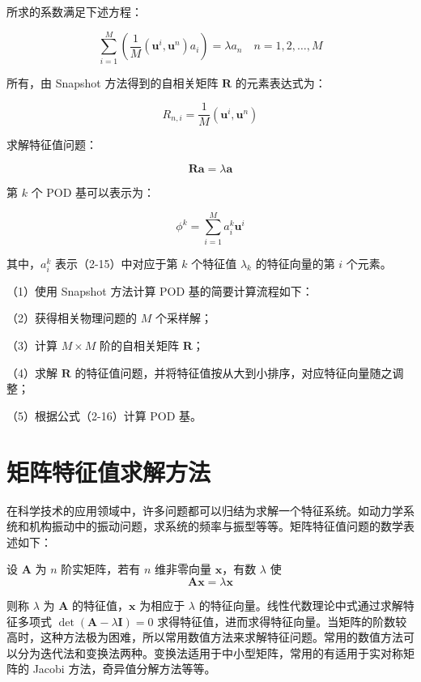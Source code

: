 所求的系数满足下述方程：

\begin{equation}
\sum_{i=1}^M \left( \frac{1}{M} (\mathbf{u}^i, \mathbf{u}^n) a_i \right) = \lambda a_n \quad n = 1, 2, \ldots, M \tag{2-13}
\end{equation}

所有，由 Snapshot 方法得到的自相关矩阵 \(\mathbf{R}\) 的元素表达式为：

\begin{equation}
R_{n,i} = \frac{1}{M} (\mathbf{u}^i, \mathbf{u}^n) \tag{2-14}
\end{equation}

求解特征值问题：

\begin{equation}
\mathbf{R} \mathbf{a} = \lambda \mathbf{a} \tag{2-15}
\end{equation}

第 \(k\) 个 POD 基可以表示为：

\begin{equation}
\phi^k = \sum_{i=1}^M a_i^k \mathbf{u}^i \tag{2-16}
\end{equation}

其中，\(a_i^k\) 表示（2-15）中对应于第 \(k\) 个特征值 \(\lambda_k\) 的特征向量的第 \(i\) 个元素。

（1）使用 Snapshot 方法计算 POD 基的简要计算流程如下：

（2）获得相关物理问题的 \(M\) 个采样解；

（3）计算 \(M \times M\) 阶的自相关矩阵 \(\mathbf{R}\)；

（4）求解 \(\mathbf{R}\) 的特征值问题，并将特征值按从大到小排序，对应特征向量随之调整；

（5）根据公式（2-16）计算 POD 基。

\section{矩阵特征值求解方法}

在科学技术的应用领域中，许多问题都可以归结为求解一个特征系统。如动力学系统和机构振动中的振动问题，求系统的频率与振型等等。矩阵特征值问题的数学表述如下：

设 \(\mathbf{A}\) 为 \(n\) 阶实矩阵，若有 \(n\) 维非零向量 \(\mathbf{x}\)，有数 \(\lambda\) 使\begin{equation}
\mathbf{A}\mathbf{x} = \lambda \mathbf{x} \tag{2-17}
\end{equation}

则称 \(\lambda\) 为 \(\mathbf{A}\) 的特征值，\(\mathbf{x}\) 为相应于 \(\lambda\) 的特征向量。线性代数理论中式通过求解特征多项式 \(\det(\mathbf{A} - \lambda \mathbf{I}) = 0\) 求得特征值，进而求得特征向量。当矩阵的阶数较高时，这种方法极为困难，所以常用数值方法来求解特征问题。常用的数值方法可以分为迭代法和变换法两种。变换法适用于中小型矩阵，常用的有适用于实对称矩阵的 Jacobi 方法，奇异值分解方法等等。

